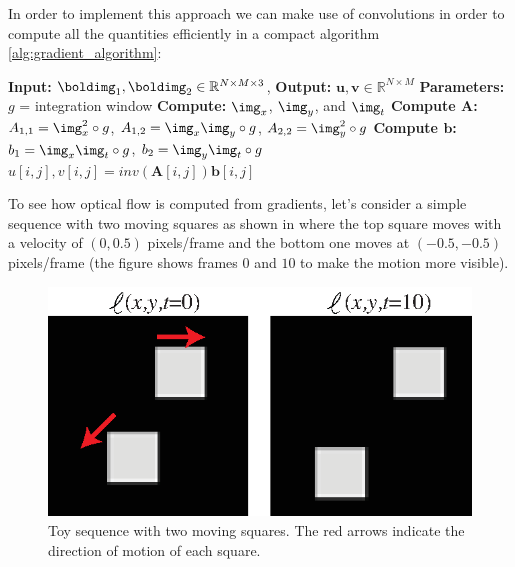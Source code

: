 In order to implement this approach we can make use of convolutions in order to compute all the quantities efficiently in a compact algorithm \ref{alg:gradient_algorithm}:

\begin{algorithm}[h]
    \SetAlgoVlined
    \DontPrintSemicolon
    \caption{{\bf Algorithm \ref{alg:gradient_algorithm}}: Gradient-based optical flow estimation using two input frames.}
    \fakealgorithmcaption{}
    \label{alg:gradient_algorithm}
    {\bf Input:} $\boldimg_1, \boldimg_2 \in \mathbb{R}^{N \times M \times 3}$,
    {\bf Output:} $\mathbf{u}, \mathbf{v} \in \mathbb{R}^{N \times M}$\;
    {\bf Parameters:} $g$ = integration window\;
    {\bf Compute:} $\img_x$, $\img_y$, and $\img_t$\;
    {\bf Compute $\mathbf{A}$:} $A_{1,1} = \img_x^2 \circ g$, $A_{1,2} = \img_x\img_y \circ g$, $A_{2,2} = \img_y^2 \circ g$ \;
    {\bf Compute $\textbf{b}$:} $b_1=\img_x\img_t \circ g$, $b_2=\img_y\img_t \circ g$ \;
    {
        {
            $u[i,j], v[i,j] = inv(\mathbf{A} [i,j])  \textbf{b}[i,j] $\;
        }
    }
\end{algorithm}




To see how optical flow is computed from gradients, let's consider a simple sequence with two moving squares as shown in \fig{\ref{fig:square_grandient_based_1}} where the top square moves with a velocity of $(0,0.5)$ pixels/frame and the bottom one moves at $(-0.5, -0.5)$ pixels/frame (the figure shows frames $0$ and $10$ to make the motion more visible).
\vspace{-0.2in}
\begin{figure}[h!]
    \centerline{
        \includegraphics[width=.4\linewidth]{figures/optical_flow/square_grandient_based_1.eps}}
    \caption{Toy sequence with two moving squares. The red arrows indicate the direction of motion of each square.}
    \label{fig:square_grandient_based_1}
\end{figure}
\vspace{-0.2in}

